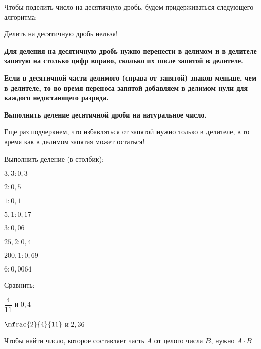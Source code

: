 %
%
%
%
\begin{class}[number=1]
	\begin{definit}
		Чтобы поделить число на десятичную дробь, будем придерживаться следующего алгоритма:
		\begin{enumcols}[itemcolumns=1]
			\item Делить на десятичную дробь нельзя!
			\item \textbf{Для деления на десятичную дробь нужно перенести в делимом и в
			делителе запятую на столько цифр вправо, сколько их после запятой в
			делителе.}
			\item \textbf{Если в десятичной части делимого (справа от запятой) знаков меньше, чем в делителе, то во время переноса запятой добавляем в делимом нули для каждого недостающего разряда.}
			\item \textbf{Выполнить деление десятичной дроби на натуральное число.}
			\item Еще раз подчеркнем, что избавляться от запятой нужно только в
			делителе, в то время как в делимом запятая может остаться!
		\end{enumcols}
	\end{definit}
	\begin{listofex}
		\item Выполнить деление (в столбик):
		\begin{enumcols}[itemcolumns=4]
			\item \( 3,3:0,3 \)
			\item \( 2:0,5 \)
			\item \( 1:0,1 \)
			\item \( 5,1:0,17 \)
			\item \( 3:0,06 \)
			\item \( 25,2:0,4 \)
			\item \( 200,1:0,69 \)
			\item \( 6:0,0064 \)
		\end{enumcols}
		\item Сравнить:
		\begin{enumcols}[itemcolumns=2]
			\item \( \dfrac{4}{11} \) и \( 0,4 \)
			\item \( \mfrac{2}{4}{11} \) и \( 2,36 \)
		\end{enumcols}
	\end{listofex}
	\begin{definit}
		Чтобы найти число, которое составляет часть \( A \) от целого числа \( B \), нужно \( A\cdot B \)

\end{definit}
\end{class}
